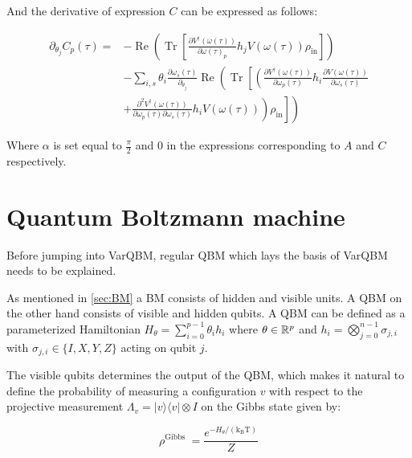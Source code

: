 \documentclass[../main.tex]{subfiles}
\begin{document}
And the derivative of expression $C$ can be expressed as follows:

\begin{equation}
\begin{aligned}
\partial_{\theta_{j}} C_{p}(\tau)=& -\operatorname{Re}\left(\operatorname{Tr}\left[\frac{\partial V^{\dagger}(\omega(\tau))}{\partial \omega(\tau)_{p}} h_{j} V(\omega(\tau)) \rho_{\mathrm{in}}\right]\right) \\
&-\sum_{i, s} \theta_{i} \frac{\partial \omega_{s}(\tau)}{\partial_{\theta_{j}}} \operatorname{Re}\left(\operatorname { T r } \left[\left(\frac{\partial V^{\dagger}(\omega(\tau))}{\partial \omega_{p}(\tau)} h_{i} \frac{\partial V(\omega(\tau))}{\partial \omega_{s}(\tau)}\right.\right.\right. \\
&\left.\left.\left.+\frac{\partial^{2} V^{\dagger}(\omega(\tau))}{\partial \omega_{p}(\tau) \partial \omega_{s}(\tau)} h_{i} V(\omega(\tau))\right) \rho_{\mathrm{in}}\right]\right)
\end{aligned}
\end{equation}

Where $\alpha$ is set equal to $\frac{\pi}{2}$ and $0$ in the expressions corresponding to $A$ and $C$ respectively. 


\section{Quantum Boltzmann machine}
Before jumping into VarQBM, regular QBM which lays the basis of VarQBM needs to be explained. 

As mentioned in \autoref{sec:BM} a BM consists of hidden and visible units. A QBM on the other hand consists of visible and hidden qubits. A QBM can be defined as a parameterized Hamiltonian $H_{\theta}=\sum_{i=0}^{p-1} \theta_{i} h_{i}$ where $\theta\in\mathbb{R}^p$ and $h_{i}=\bigotimes_{j=0}^{n-1} \sigma_{j, i}$ with $\sigma_{j, i} \in\{I, X, Y, Z\}$ acting on qubit $j$.

The visible qubits determines the output of the QBM, which makes it natural to define the probability of measuring a configuration $v$ with respect to the projective measurement $\Lambda_{v}=|v\rangle\langle v| \otimes I$ on the Gibbs state given by:

\begin{equation}
\rho^{\text {Gibbs }}=\frac{e^{-H_{\theta} /\left(\mathrm{k}_{\mathrm{B}} \mathrm{T}\right)}}{Z}
\end{equation}
\end{document}
